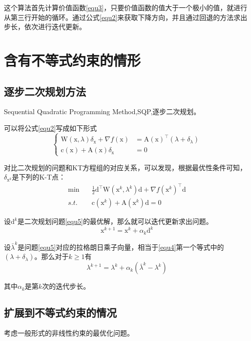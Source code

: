\documentclass[a4paper]{D:/repositories/MyDGP/latex/PaperReadingLog}
\begin{document}
这个算法首先计算价值函数\ref{equ3}，只要价值函数的值大于一个极小的值，就进行从第三行开始的循环。通过公式\ref{equ2}来获取下降方向，并且通过回退的方法求出步长，依次进行迭代更新。

\section{含有不等式约束的情形}
\subsection{逐步二次规划方法}
Sequential Quadratic Programming Method,SQP,逐步二次规划。

可以将公式\ref{equ2}写成如下形式
\begin{equation}
    \label{equ4}
\left\{
\begin{aligned}
    \mathrm{W}(\mathrm{x},\lambda)\delta_\mathrm{x}+\nabla f(\mathrm{x})&=\mathrm{A}(\mathrm{x})^\top (\lambda+\delta_\lambda)\\
    \mathrm{c}(\mathrm{x})+\mathrm{A}(\mathrm{x})\delta_\mathrm{x}&=0
\end{aligned}
\right.
\end{equation}

对比二次规划的问题和KT方程组的对应关系，可以发现，根据最优性条件可知，$\delta_{\mathrm{x}^k}$是下列的K-T点：
\begin{equation}
    \label{equ5}
    \begin{aligned}
        \min\quad&\frac{1}{2}\mathrm{d}^\top\mathrm{W}(\mathrm{x}^k,\lambda^k)\mathrm{d}+\nabla f(\mathrm{x}^k)^\top\mathrm{d}\\
        s.t.\quad&\mathrm{c}(\mathrm{x}^k)+\mathrm{A}(\mathrm{x}^k)\mathrm{d}=0
    \end{aligned}
\end{equation}


设$\mathrm{d}^k$是二次规划问题\ref{equ5}的最优解，那么就可以迭代更新求出问题。
$$
\mathrm{x}^{k+1}=\mathrm{x}^k+\alpha_k\mathrm{d}^k
$$

设$\bar{\lambda}^k$是问题\ref{equ5}对应的拉格朗日乘子向量，相当于\ref{equ4}第一个等式中的$(\lambda+\delta_\lambda)$。那么对于$k\ge 1$有
$$
\lambda^{k+1}=\lambda^k+\alpha_k(\bar{\lambda}^k-\lambda^k)
$$

其中$\alpha_k$是第$k$次的迭代步长。

\subsection{扩展到不等式约束的情况}
考虑一般形式的非线性约束的最优化问题。
\end{document}
